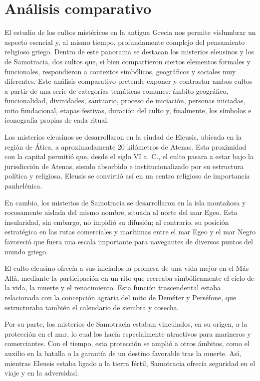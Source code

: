 \chapter{Análisis comparativo}

El estudio de los cultos mistéricos en la antigua Grecia nos permite vislumbrar un aspecto esencial y, al mismo tiempo, profundamente complejo del pensamiento religioso griego. Dentro de este panorama se destacan los misterios eleusinos y los de Samotracia, dos cultos que, si bien compartieron ciertos elementos formales y funcionales, respondieron a contextos simbólicos, geográficos y sociales muy diferentes. Este análisis comparativo pretende exponer y contrastar ambos cultos a partir de una serie de categorías temáticas comunes: ámbito geográfico, funcionalidad, divinidades, santuario, proceso de iniciación, personas iniciadas, mito fundacional, etapas festivas, duración del culto y, finalmente, los símbolos e iconografía propias de cada ritual.

Los misterios eleusinos se desarrollaron en la ciudad de Eleusis, ubicada en la región de Ática, a aproximadamente 20 kilómetros de Atenas. Esta proximidad con la capital permitió que, desde el siglo VI a. C., el culto pasara a estar bajo la jurisdicción de Atenas, siendo absorbido e institucionalizado por su estructura política y religiosa. Eleusis se convirtió así en un centro religioso de importancia panhelénica.

En cambio, los misterios de Samotracia se desarrollaron en la isla montañosa y rocosamente aislada del mismo nombre, situada al norte del mar Egeo. Esta insularidad, sin embargo, no impidió su difusión; al contrario, su posición estratégica en las rutas comerciales y marítimas entre el mar Egeo y el mar Negro favoreció que fuera una escala importante para navegantes de diversos puntos del mundo griego.

El culto eleusino ofrecía a sus iniciados la promesa de una vida mejor en el Más Allá, mediante la participación en un rito que recreaba simbólicamente el ciclo de la vida, la muerte y el renacimiento. Esta función trascendental estaba relacionada con la concepción agraria del mito de Deméter y Perséfone, que estructuraba también el calendario de siembra y cosecha.

Por su parte, los misterios de Samotracia estaban vinculados, en su origen, a la protección en el mar, lo cual los hacía especialmente atractivos para marineros y comerciantes. Con el tiempo, esta protección se amplió a otros ámbitos, como el auxilio en la batalla o la garantía de un destino favorable tras la muerte. Así, mientras Eleusis estaba ligado a la tierra fértil, Samotracia ofrecía seguridad en el viaje y en la adversidad.

